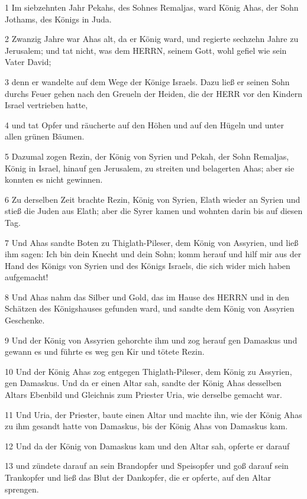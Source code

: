\par 1 Im siebzehnten Jahr Pekahs, des Sohnes Remaljas, ward König Ahas, der Sohn Jothams, des Königs in Juda.
\par 2 Zwanzig Jahre war Ahas alt, da er König ward, und regierte sechzehn Jahre zu Jerusalem; und tat nicht, was dem HERRN, seinem Gott, wohl gefiel wie sein Vater David;
\par 3 denn er wandelte auf dem Wege der Könige Israels. Dazu ließ er seinen Sohn durchs Feuer gehen nach den Greueln der Heiden, die der HERR vor den Kindern Israel vertrieben hatte,
\par 4 und tat Opfer und räucherte auf den Höhen und auf den Hügeln und unter allen grünen Bäumen.
\par 5 Dazumal zogen Rezin, der König von Syrien und Pekah, der Sohn Remaljas, König in Israel, hinauf gen Jerusalem, zu streiten und belagerten Ahas; aber sie konnten es nicht gewinnen.
\par 6 Zu derselben Zeit brachte Rezin, König von Syrien, Elath wieder an Syrien und stieß die Juden aus Elath; aber die Syrer kamen und wohnten darin bis auf diesen Tag.
\par 7 Und Ahas sandte Boten zu Thiglath-Pileser, dem König von Assyrien, und ließ ihm sagen: Ich bin dein Knecht und dein Sohn; komm herauf und hilf mir aus der Hand des Königs von Syrien und des Königs Israels, die sich wider mich haben aufgemacht!
\par 8 Und Ahas nahm das Silber und Gold, das im Hause des HERRN und in den Schätzen des Königshauses gefunden ward, und sandte dem König von Assyrien Geschenke.
\par 9 Und der König von Assyrien gehorchte ihm und zog herauf gen Damaskus und gewann es und führte es weg gen Kir und tötete Rezin.
\par 10 Und der König Ahas zog entgegen Thiglath-Pileser, dem König zu Assyrien, gen Damaskus. Und da er einen Altar sah, sandte der König Ahas desselben Altars Ebenbild und Gleichnis zum Priester Uria, wie derselbe gemacht war.
\par 11 Und Uria, der Priester, baute einen Altar und machte ihn, wie der König Ahas zu ihm gesandt hatte von Damaskus, bis der König Ahas von Damaskus kam.
\par 12 Und da der König von Damaskus kam und den Altar sah, opferte er darauf
\par 13 und zündete darauf an sein Brandopfer und Speisopfer und goß darauf sein Trankopfer und ließ das Blut der Dankopfer, die er opferte, auf den Altar sprengen.
